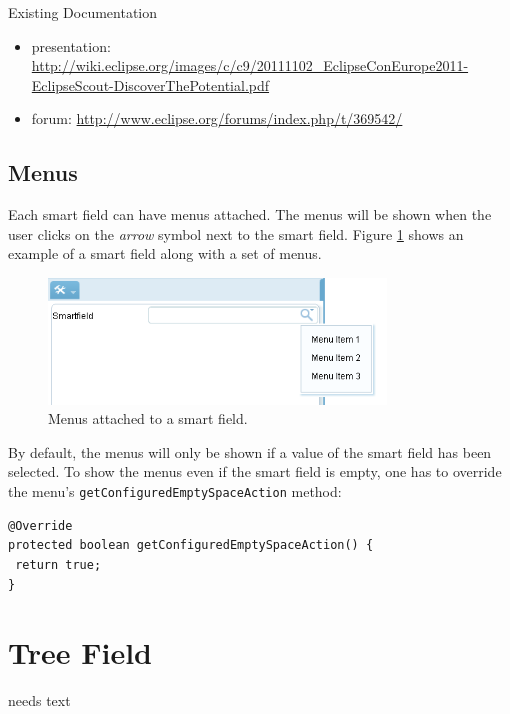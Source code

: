 \documentclass[a4paper,10pt,twoside]{book}
\begin{document}
{\noindent Existing Documentation
\begin{itemize}
  \item presentation: \url{http://wiki.eclipse.org/images/c/c9/20111102_EclipseConEurope2011-EclipseScout-DiscoverThePotential.pdf}
  \item forum: \url{http://www.eclipse.org/forums/index.php/t/369542/}
\end{itemize}

\subsection{Menus}
Each smart field can have menus attached. The menus will be shown when the user clicks on the \emph{arrow} symbol next to the smart field. Figure \ref{fig:smartfield_menu} shows an example of a smart field along with a set of menus.
\begin{figure}[!htb]
\centering
\includegraphics[width=0.8\textwidth]{smartfieldmenu.png}
\caption{Menus attached to a smart field.}
\label{fig:smartfield_menu}
\end{figure}

By default, the menus will only be shown if a value of the smart field has been selected. To show the menus even if the smart field is empty, one has to override the menu's \lstinline$getConfiguredEmptySpaceAction$ method:

\begin{lstlisting}[backgroundcolor=\color{white}]
@Override
protected boolean getConfiguredEmptySpaceAction() {
 return true;
}
\end{lstlisting}

\section{Tree Field}
needs text

}
\end{document}
